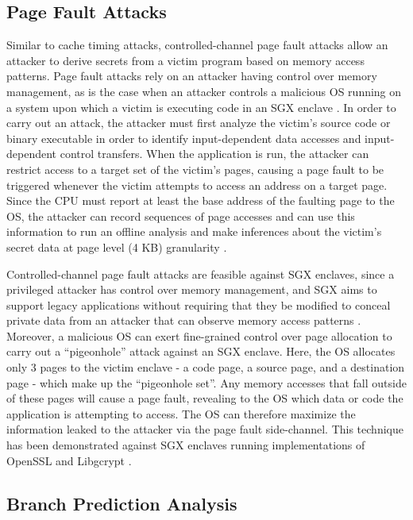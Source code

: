 \subsection{Page Fault Attacks}

Similar to cache timing attacks, controlled-channel page fault attacks allow an attacker to derive secrets from a victim program based on memory access patterns. Page fault attacks rely on an attacker having control over memory management, as is the case when an attacker controls a malicious OS running on a system upon which a victim is executing code in an SGX enclave \cite{intel_corporation_tutorial_2015}. In order to carry out an attack, the attacker must first analyze the victim's source code or binary executable in order to identify input-dependent data accesses and input-dependent control transfers. When the application is run, the attacker can restrict access to a target set of the victim's pages, causing a page fault to be triggered whenever the victim attempts to access an address on a target page. Since the CPU must report at least the base address of the faulting page to the OS, the attacker can record sequences of page accesses and can use this information to run an offline analysis and make inferences about the victim's secret data at page level (4 KB) granularity \cite{xu_controlled-channel_2015, shinde_preventing_2015}.

Controlled-channel page fault attacks are feasible against SGX enclaves, since a privileged attacker has control over memory management, and SGX aims to support legacy applications without requiring that they be modified to conceal private data from an attacker that can observe memory access patterns \cite{xu_controlled-channel_2015}. Moreover, a malicious OS can exert fine-grained control over page allocation to carry out a ``pigeonhole'' attack against an SGX enclave. Here, the OS allocates only 3 pages to the victim enclave - a code page, a source page, and a destination page - which make up the ``pigeonhole set''. Any memory accesses that fall outside of these pages will cause a page fault, revealing to the OS which data or code the application is attempting to access. The OS can therefore maximize the information leaked to the attacker via the page fault side-channel. This technique has been demonstrated against SGX enclaves running implementations of OpenSSL and Libgcrypt \cite{shinde_preventing_2015}. 

\subsection{Branch Prediction Analysis}

